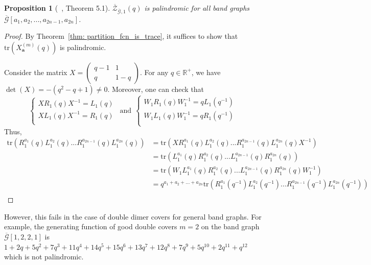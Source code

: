 \documentclass[11pt]{amsart}
\newcommand\m[1]{\begin{pmatrix}#1\end{pmatrix}}
\newtheorem{prop}[thm]{Proposition}
\theoremstyle{definition}
\theoremstyle{remark}
\numberwithin{equation}{section}
\begin{document}
\begin{prop}[~\cite{fence_posets}, Theorem 5.1]
    $\overline{\mathcal{Z}}_{\overline{\mathcal{G}},1}(q)$ is palindromic for all band graphs $\overline{\mathcal{G}}[a_1,a_2,...,a_{2n-1},a_{2n}]$. 
\end{prop}
\begin{proof}
    By Theorem~\ref{thm: partition_fcn_is_trace}, it suffices to show that $\text{tr}(X^{(m)}_{\mathbf{a}}(q))$ is palindromic. 

    Consider the matrix $X = \m{q-1& 1\\q&1-q}$. For any $q\in \mathbb{R}^+$, we have $\det(X) = -(q^2-q+1)\neq 0$. Moreover, one can check that
    \begin{equation}
        \begin{cases}
            XR_1(q)X^{-1} = L_1(q)\\
            XL_1(q)X^{-1} = R_1(q)\\
        \end{cases}\:\:\text{and}\:\:\begin{cases}
            W_1R_1(q)W_1^{-1} = qL_1(q^{-1})\\
            W_1L_1(q)W_1^{-1} = qR_1(q^{-1})\\
        \end{cases}
    \end{equation}
    Thus, 
    \begin{equation}
        \begin{split}
            \text{tr}(R^{a_1}_1(q)L^{a_2}_1(q)...R^{a_{2n-1}}_1(q)L^{a_{2n}}_1(q))&= \text{tr}(XR^{a_1}_1(q)L^{a_2}_1(q)...R^{a_{2n-1}}_1(q)L^{a_{2n}}_1(q)X^{-1})\\
            &= \text{tr}(L^{a_1}_1(q)R^{a_2}_1(q)...L^{a_{2n-1}}_1(q)R^{a_{2n}}_1(q))\\
            &= \text{tr}(W_1L^{a_1}_1(q)R^{a_2}_1(q)...L^{a_{2n-1}}_1(q)R^{a_{2n}}_1(q)W_1^{-1})\\
            &= q^{a_1+a_2+...+a_{2n}}\text{tr}(R^{a_1}_1(q^{-1})L^{a_2}_1(q^{-1})...R^{a_{2n-1}}_1(q^{-1})L^{a_{2n}}_1(q^{-1}))\\
        \end{split}
    \end{equation}
\end{proof}

However, this fails in the case of double dimer covers for general band graphs. For example, the generating function of good double covers $m=2$ on the band graph $\overline{\mathcal{G}}[1,2,2,1]$ is \(1+2q+5q^2+7q^3+11q^4+14q^5+15q^6+13q^7+12q^8+7q^9+5q^{10}+2q^{11}+q^{12}\) which is not palindromic. 
\end{document}
